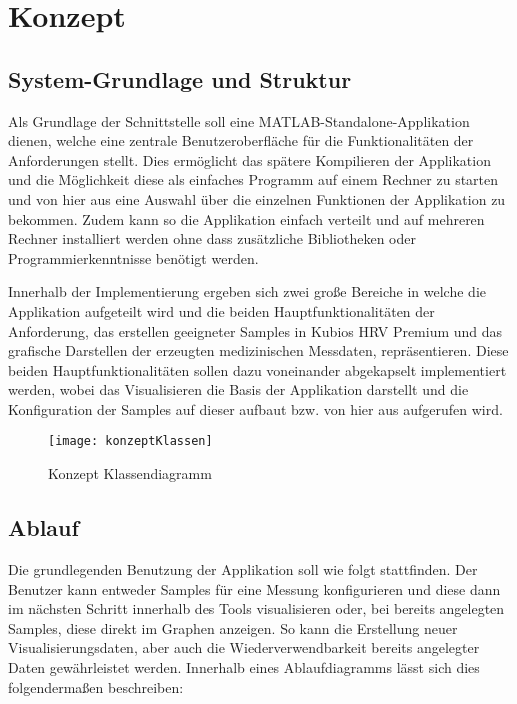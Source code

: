 
\chapter{Konzept}

\section{System-Grundlage und Struktur}
Als Grundlage der Schnittstelle soll eine MATLAB-Standalone-Applikation dienen, welche eine zentrale Benutzeroberfläche für die Funktionalitäten der Anforderungen stellt. Dies ermöglicht das spätere Kompilieren der Applikation und die Möglichkeit diese als einfaches Programm auf einem Rechner zu starten und von hier aus eine Auswahl über die einzelnen Funktionen der Applikation zu bekommen. Zudem kann so die Applikation einfach verteilt und auf mehreren Rechner installiert werden ohne dass zusätzliche Bibliotheken oder Programmierkenntnisse benötigt werden.

Innerhalb der Implementierung ergeben sich zwei große Bereiche in welche die Applikation aufgeteilt wird und die beiden Hauptfunktionalitäten der Anforderung, das erstellen geeigneter Samples in Kubios HRV Premium und das grafische Darstellen der erzeugten medizinischen Messdaten, repräsentieren. Diese beiden Hauptfunktionalitäten sollen dazu voneinander abgekapselt implementiert werden, wobei das Visualisieren die Basis der Applikation darstellt und die Konfiguration der Samples auf dieser aufbaut bzw. von hier aus aufgerufen wird.

\begin{figure}[H]
	\centering
	\texttt{[image: konzeptKlassen]}
	\caption{Konzept Klassendiagramm}
	\label{fig:konzeptKlassen}
\end{figure}

\section{Ablauf}
Die grundlegenden Benutzung der Applikation soll wie folgt stattfinden. Der Benutzer kann entweder Samples für eine Messung konfigurieren und diese dann im nächsten Schritt innerhalb des Tools visualisieren oder, bei bereits angelegten Samples, diese direkt im Graphen anzeigen. So kann die Erstellung neuer Visualisierungsdaten, aber auch die Wiederverwendbarkeit bereits angelegter Daten gewährleistet werden. Innerhalb eines Ablaufdiagramms lässt sich dies folgendermaßen beschreiben:

